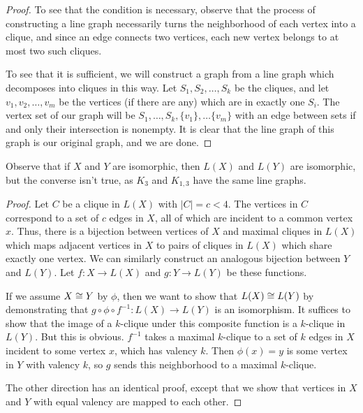 \begin{proof}
	
	To see that the condition is necessary, observe that the process of constructing a line graph necessarily turns the neighborhood of each vertex into a clique, and since an edge connects two vertices, each new vertex belongs to at most two such cliques.
	
	To see that it is sufficient, we will construct a graph from a line graph which decomposes into cliques in this way.  Let $S_1,S_2,\dots,S_k$ be the cliques, and let $v_1,v_2,\dots,v_m$ be the vertices (if there are any) which are in exactly one $S_i$.  The vertex set of our graph will be $S_1,\dots,S_k,\{v_1\},\dots \{v_m\}$ with an edge between sets if and only their intersection is nonempty.  It is clear that the line graph of this graph is our original graph, and we are done.
	
\end{proof}

Observe that if $X$ and $Y$ are isomorphic, then $L(X)$ and $L(Y)$ are isomorphic, but the converse isn't true, as $K_3$ and $K_{1,3}$ have the same line graphs.


\begin{proof}
	Let $C$ be a clique in $L(X)$ with $|C|=c<4$.  The vertices in $C$ correspond to a set of $c$ edges in $X$, all of which are incident to a common vertex $x$.  Thus, there is a bijection between vertices of $X$ and maximal cliques in $L(X)$ which maps adjacent vertices in $X$ to pairs of cliques in $L(X)$ which share exactly one vertex.  We can similarly construct an analogous bijection between $Y$ and $L(Y)$.  Let $f:X\rightarrow L(X)$ and $g:Y\rightarrow L(Y)$ be these functions.
	
	If we assume $X\cong Y$ by $\phi$, then we want to show that $L(X)\cong L(Y)$ by demonstrating that $g\circ\phi\circ f^{-1}:L(X)\rightarrow L(Y)$ is an isomorphism.  It suffices to show that the image of a $k$-clique under this composite function is a $k$-clique in $L(Y)$.  But this is obvious.  $f^{-1}$ takes a maximal $k$-clique to a set of $k$ edges in $X$ incident to some vertex $x$, which has valency $k$.  Then $\phi(x)=y$ is some vertex in $Y$ with valency $k$, so $g$ sends this neighborhood to a maximal $k$-clique.
	
	The other direction has an identical proof, except that we show that vertices in $X$ and $Y$ with equal valency are mapped to each other.
\end{proof}

